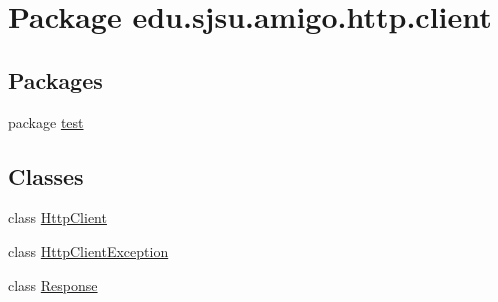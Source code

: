 \hypertarget{namespaceedu_1_1sjsu_1_1amigo_1_1http_1_1client}{}\section{Package edu.\+sjsu.\+amigo.\+http.\+client}
\label{namespaceedu_1_1sjsu_1_1amigo_1_1http_1_1client}
\subsection*{Packages}
\begin{DoxyCompactItemize}
\item 
package \hyperlink{namespaceedu_1_1sjsu_1_1amigo_1_1http_1_1client_1_1test}{test}
\end{DoxyCompactItemize}
\subsection*{Classes}
\begin{DoxyCompactItemize}
\item 
class \hyperlink{classedu_1_1sjsu_1_1amigo_1_1http_1_1client_1_1_http_client}{Http\+Client}
\item 
class \hyperlink{classedu_1_1sjsu_1_1amigo_1_1http_1_1client_1_1_http_client_exception}{Http\+Client\+Exception}
\item 
class \hyperlink{classedu_1_1sjsu_1_1amigo_1_1http_1_1client_1_1_response}{Response}
\end{DoxyCompactItemize}
